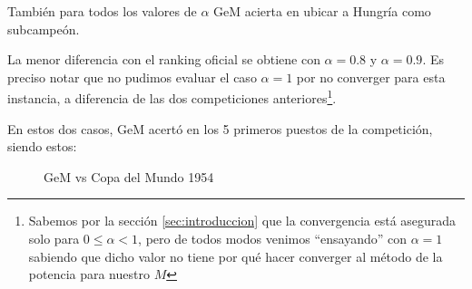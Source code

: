 \begin{enumerate}[parsep=1ex]
        \par También para todos los valores de $\alpha$ GeM acierta en ubicar a
        Hungría como subcampeón.

        \par La menor diferencia con el ranking oficial se obtiene con
        $\alpha=0.8$ y $\alpha=0.9$. Es preciso notar que no pudimos evaluar el
        caso $\alpha=1$ por no converger para esta instancia, a diferencia de
        las dos competiciones anteriores\footnote{Sabemos por la secci\'on
        \ref{sec:introduccion} que la convergencia está asegurada solo para $0\leq\alpha <1$, pero de todos modos venimos
        ``ensayando'' con $\alpha=1$ sabiendo que dicho valor no tiene por qué hacer
        converger al m\'etodo de la potencia para nuestro $M$}.

        \par En estos dos casos, GeM acertó en los 5 primeros puestos de la
        competición, siendo estos:

        \begin{figure}[H]
            \centering
            \caption{GeM vs Copa del Mundo 1954}
            \hspace{10pt}
        \end{figure}
\end{enumerate}
\medskip


